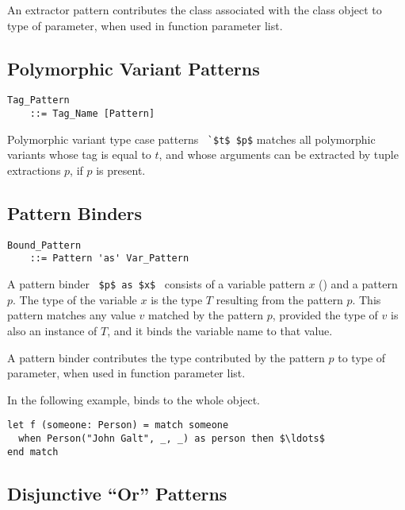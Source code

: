 An extractor pattern contributes the class associated with the class object to type of parameter, when used in function parameter list. 





\subsection{Polymorphic Variant Patterns}
\label{sec:polymorphic-variant-patterns}

\grammar\begin{lstlisting}
Tag_Pattern 
    ::= Tag_Name [Pattern]
\end{lstlisting}

Polymorphic variant type case patterns ~\lstinline!`$t$ $p$! matches all polymorphic variants whose tag is equal to $t$, and whose arguments can be extracted by tuple extractions $p$, if $p$ is present. 





\subsection{Pattern Binders}
\label{sec:pattern-binders}

\grammar\begin{lstlisting}
Bound_Pattern 
    ::= Pattern 'as' Var_Pattern
\end{lstlisting}

A pattern binder ~\lstinline!$p$ as $x$!~ consists of a variable pattern $x$ () and a pattern $p$. The type of the variable $x$ is the type $T$ resulting from the pattern $p$. This pattern matches any value $v$ matched by the pattern $p$, provided the type of $v$ is also an instance of $T$, and it binds the variable name to that value. 

A pattern binder contributes the type contributed by the pattern $p$ to type of parameter, when used in function parameter list. 

\example In the following example,  binds to the whole  object. 
\begin{lstlisting}
let f (someone: Person) = match someone
  when Person("John Galt", _, _) as person then $\ldots$
end match
\end{lstlisting}





\subsection[Disjunctive “Or” Patterns]{Disjunctive ``Or'' Patterns}
\label{sec:disjunctive-patterns}

